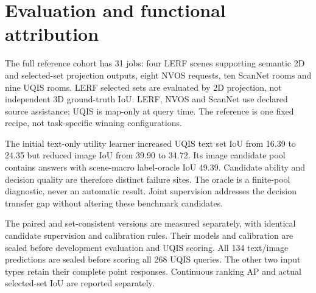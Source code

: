 \documentclass[10pt]{article}
\begin{document}
\section{Evaluation and functional attribution}
The full reference cohort has 31 jobs: four LERF scenes supporting semantic 2D
and selected-set projection outputs, eight NVOS requests, ten ScanNet rooms and
nine UQIS rooms. LERF selected sets are evaluated by 2D projection, not independent
3D ground-truth IoU. LERF, NVOS and ScanNet use declared source assistance; UQIS
is map-only at query time. The reference is one fixed recipe, not task-specific
winning configurations.

\begin{table}[ht]
\centering\small
\resizebox{\linewidth}{!}{}
\caption{Retained complete-system capability. These metrics belong to its
existing providers, not automatically to the proposed learned decision.}
\end{table}

The initial text-only utility learner increased UQIS text set IoU from 16.39 to
24.35 but reduced image IoU from 39.90 to 34.72. Its image candidate pool contains
answers with scene-macro label-oracle IoU 49.39. Candidate ability and decision
quality are therefore distinct failure sites. The oracle is a finite-pool
diagnostic, never an automatic result. Joint supervision addresses the decision
transfer gap without altering these benchmark candidates.

The paired and set-consistent versions are measured separately, with identical
candidate supervision and calibration rules. Their models and calibration are sealed before development evaluation and UQIS
scoring. All 134 text/image predictions are sealed before scoring all 268 UQIS
queries. The other two input types retain their complete point responses.
Continuous ranking AP and actual selected-set IoU are reported separately.

\end{document}
